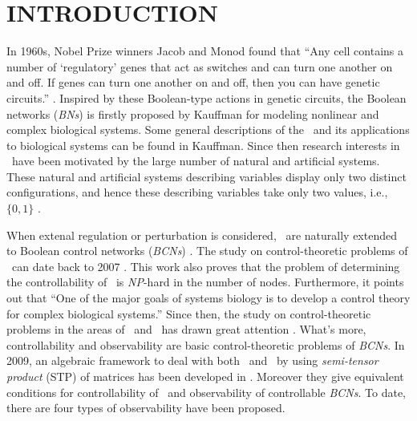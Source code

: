 \section{INTRODUCTION}

In 1960s, Nobel Prize winners Jacob and Monod found that  ``Any cell contains a number of `regulatory' genes that act as switches and can turn one another on and off. If genes can turn one another on and off, then you can have genetic circuits.'' \cite{Waldrop1992Complexity,cheng2009controllability}. Inspired by these Boolean-type actions in genetic circuits, the Boolean networks ({\em BNs}) is firstly proposed by Kauffman \cite{Kauffman1968Metabolic} for modeling nonlinear and complex biological systems. Some general descriptions of the \BNs\ and its applications to biological systems can be found in Kauffman. Since then research interests in  \BNs\ have been motivated by the large number of natural and artificial systems. These natural and artificial systems describing variables display only two distinct configurations, and hence these describing variables take only two values, i.e., $\{0,1\}$  \cite{Akutsu2000Inferring, Shmulevich2002From, Faur2006Dynamical,Green2007The,Lou2010Multi,Fornasini2013Observability}.

When extenal regulation or perturbation is considered, \BNs\ are naturally extended to Boolean control networks ({\em BCNs}) \cite{Ideker2001A}. The study on control-theoretic problems of \BCNs\ can date back to 2007 \cite{Akutsu2007Control}. This work also proves that the problem of determining the controllability of \BCNs\ is {\em NP}-hard in the number of nodes. Furthermore, it points out that ``One of the major goals of systems biology is to develop a control theory for complex biological systems.'' Since then, the study on control-theoretic problems in the areas of \BNs\ and \BCNs\ has drawn great attention \cite{cheng2009controllability, Zhao2010Input, Cheng2011Identification, Cheng2011Analysis,Fornasini2013Observability}. What's more, controllability and observability are basic control-theoretic problems of {\em BCNs}. In 2009, an algebraic framework to deal with both \BNs\ and \BCNs\ by using \emph{semi-tensor product} (STP) of matrices has been developed in \cite{cheng2009controllability}. Moreover they give equivalent conditions for controllability of \BCNs\ and observability of controllable {\em BCNs}. To date, there are four types of observability have been proposed. 

